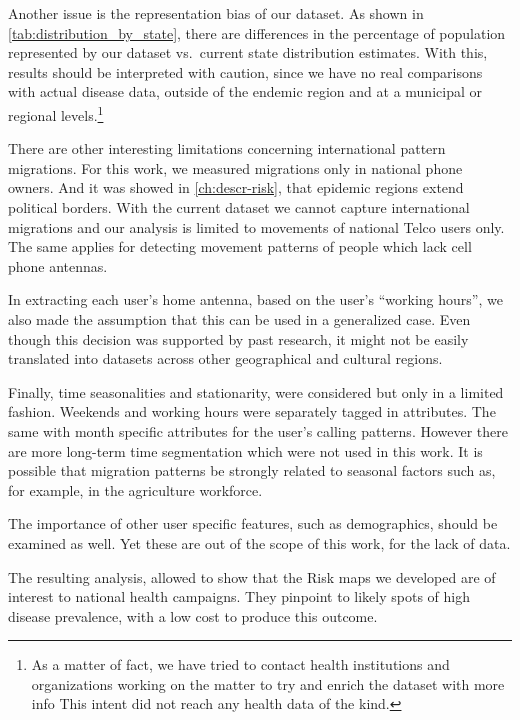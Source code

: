 Another issue is the representation bias of our dataset.
As shown in \cref{tab:distribution_by_state}, there are differences in the percentage of population represented by our dataset vs.\ current state distribution estimates.
With this, results should be interpreted with caution, since we have no real comparisons with actual disease data, outside of the endemic region and at a municipal or regional levels.\footnote{As a matter of fact, we have tried to contact health institutions and organizations working on the matter to try and enrich the dataset with more info
This intent did not reach any health data of the kind.}

There are other interesting limitations concerning international pattern migrations.
For this work, we measured migrations only in national phone owners.
And it was showed in \cref{ch:descr-risk}, that  epidemic regions extend political borders.
With the current dataset we cannot capture international migrations and our analysis is limited to movements of national Telco users only.
The same applies for detecting movement patterns of people which lack cell phone antennas.

In extracting each user's home antenna, based on the user's ``working hours'', we also made the assumption that this can be used in a generalized case.
Even though this decision was supported by past research, it might not be easily translated into datasets across other geographical and cultural regions.

Finally, time seasonalities and stationarity, were considered but only in a limited fashion.
Weekends and working hours were separately tagged in attributes.
The same with month specific attributes for the user's calling patterns.
However there are more long-term time segmentation which were not used in this work.
It is possible that migration patterns be strongly related to seasonal factors such as, for example, in the agriculture workforce.

The importance of other user specific features, such as demographics, should be examined as well.
Yet these are out of the scope of this work, for the lack of data.








The resulting analysis, allowed to show that the Risk maps we developed are of interest to national health campaigns.
They pinpoint to likely spots of high disease prevalence, with a low cost to produce this outcome.

